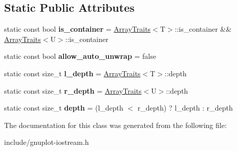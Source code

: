 \subsection*{Static Public Attributes}
\begin{DoxyCompactItemize}
\item 
\mbox{\label{classgnuplotio_1_1ArrayTraits_3_01std_1_1pair_3_01T_00_01U_01_4_01_4_a8656ab8094037d88b470f718ff7197e0}} 
static const bool {\bfseries is\+\_\+container} = \hyperlink{classgnuplotio_1_1ArrayTraits}{Array\+Traits}$<$T$>$\+::is\+\_\+container \&\& \hyperlink{classgnuplotio_1_1ArrayTraits}{Array\+Traits}$<$U$>$\+::is\+\_\+container
\item 
\mbox{\label{classgnuplotio_1_1ArrayTraits_3_01std_1_1pair_3_01T_00_01U_01_4_01_4_afff9ebffb39ab8660bb59ffcc7d8a2e5}} 
static const bool {\bfseries allow\+\_\+auto\+\_\+unwrap} = false
\item 
\mbox{\label{classgnuplotio_1_1ArrayTraits_3_01std_1_1pair_3_01T_00_01U_01_4_01_4_ae8be9661c88a8970da3d87c1afc063dc}} 
static const size\+\_\+t {\bfseries l\+\_\+depth} = \hyperlink{classgnuplotio_1_1ArrayTraits}{Array\+Traits}$<$T$>$\+::depth
\item 
\mbox{\label{classgnuplotio_1_1ArrayTraits_3_01std_1_1pair_3_01T_00_01U_01_4_01_4_a1b7e7f8976a5d0ed20b93ede3e25a546}} 
static const size\+\_\+t {\bfseries r\+\_\+depth} = \hyperlink{classgnuplotio_1_1ArrayTraits}{Array\+Traits}$<$U$>$\+::depth
\item 
\mbox{\label{classgnuplotio_1_1ArrayTraits_3_01std_1_1pair_3_01T_00_01U_01_4_01_4_a11b3be89ac9506fcfcceb318acc7e2bf}} 
static const size\+\_\+t {\bfseries depth} = (l\+\_\+depth $<$ r\+\_\+depth) ? l\+\_\+depth \+: r\+\_\+depth
\end{DoxyCompactItemize}


The documentation for this class was generated from the following file\+:\begin{DoxyCompactItemize}
\item 
include/gnuplot-\/iostream.\+h\end{DoxyCompactItemize}
